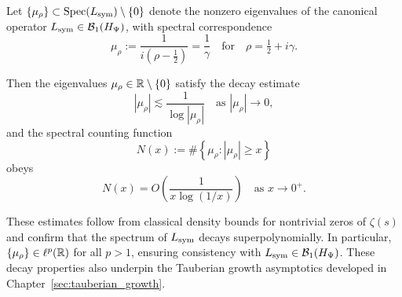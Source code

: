 \begin{lemma}
\label{lem:spectral_decay_bounds}
Let \( \{ \mu_\rho \} \subset \operatorname{Spec}(L_{\mathrm{sym}}) \setminus \{0\} \) denote the nonzero eigenvalues of the canonical operator \( L_{\mathrm{sym}} \in \mathcal{B}_1(H_{\Psi}) \), with spectral correspondence
\[
\mu_\rho := \frac{1}{i(\rho - \tfrac{1}{2})} = \frac{1}{\gamma}
\quad \text{for} \quad \rho = \tfrac{1}{2} + i\gamma.
\]

Then the eigenvalues \( \mu_\rho \in \mathbb{R} \setminus \{0\} \) satisfy the decay estimate
\[
|\mu_\rho| \lesssim \frac{1}{\log |\mu_\rho|} \quad \text{as } |\mu_\rho| \to 0,
\]
and the spectral counting function
\[
N(x) := \#\left\{ \mu_\rho : |\mu_\rho| \geq x \right\}
\]
obeys
\[
N(x) = O\left( \frac{1}{x \log (1/x)} \right) \quad \text{as } x \to 0^+.
\]

\medskip
\noindent
These estimates follow from classical density bounds for nontrivial zeros of \( \zeta(s) \) and confirm that the spectrum of \( L_{\mathrm{sym}} \) decays superpolynomially. In particular, \( \{ \mu_\rho \} \in \ell^p(\mathbb{R}) \) for all \( p > 1 \), ensuring consistency with \( L_{\mathrm{sym}} \in \mathcal{B}_1(H_{\Psi}) \). These decay properties also underpin the Tauberian growth asymptotics developed in Chapter~\ref{sec:tauberian_growth}.
\end{lemma}
